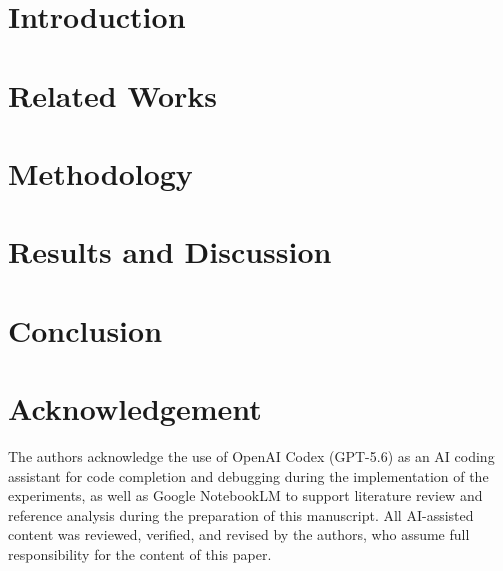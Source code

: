 \documentclass[conference]{IEEEtran}
\begin{document}
\section{Introduction}
\label{sec:intro}


\section{Related Works}
\label{sec:related}


\section{Methodology}
\label{sec:methodology}


\section{Results and Discussion}
\label{sec:results}


\section{Conclusion}
\label{sec:conclusion}


\section*{Acknowledgement}
The authors acknowledge the use of OpenAI Codex (GPT-5.6) as an AI coding assistant for code completion and debugging during the implementation of the experiments, as well as Google NotebookLM to support literature review and reference analysis during the preparation of this manuscript. All AI-assisted content was reviewed, verified, and revised by the authors, who assume full responsibility for the content of this paper.



\end{document}
